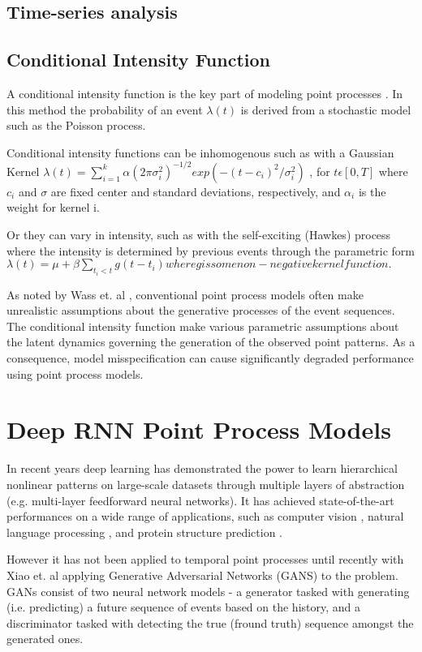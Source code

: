 \subsection{Time-series analysis}


\subsection{Conditional Intensity Function}

A conditional intensity function is the key part of modeling point processes \parencite{DuWang}. In this method the probability of an event $\lambda(t)$ is derived from a stochastic model such as the Poisson process. 

Conditional intensity functions can be inhomogenous such as with a Gaussian Kernel $\lambda(t) = \sum^k_{i=1}\alpha(2\pi \sigma^2_i)^{-1/2}exp(-(t-c_i)^2/\sigma^2_i)$
, for $t \epsilon [0,T]$ where $c_i$ and $\sigma$ are fixed center and standard deviations, respectively, and $\alpha_i$ is the weight for kernel i.

Or they can vary in intensity, such as with the self-exciting (Hawkes) process where the intensity is determined by previous events through the parametric form $\lambda(t) = \mu + \beta \sum_{t_i<t}g(t-t_i) where g is some non-negative kernel function.$

As noted by Wass et. al \parencite{Wass}, conventional point process models often make unrealistic assumptions about the generative processes of the event sequences. The conditional intensity function make various parametric assumptions about the latent dynamics governing the generation of the observed point patterns. As a consequence, model misspecification can cause significantly degraded
performance using point process models.

\section{Deep RNN Point Process Models}

In recent years deep learning has demonstrated the power to learn hierarchical nonlinear patterns on large-scale datasets \parencite{DL} through multiple layers of abstraction (e.g. multi-layer feedforward neural networks). It has achieved state-of-the-art performances on a wide range of applications, such as computer vision \parencite{ImageNet}, natural language processing \parencite{Socher}, and protein structure prediction \parencite{Lena}.

However it has not been applied to temporal point processes until recently with Xiao et. al \parencite{Wass} applying Generative Adversarial Networks (GANS) to the problem. GANs consist of two neural network models - a generator tasked with generating (i.e. predicting) a future sequence of events based on the history, and a discriminator tasked with detecting the true (fround truth) sequence amongst the generated ones.

